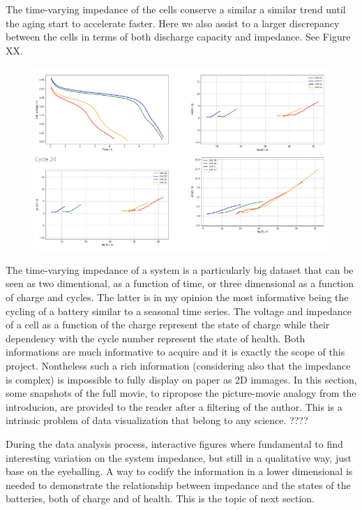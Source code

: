 The time-varying impedance of the cells conserve a similar a similar trend until the aging start to accelerate faster. Here we also assist to a larger discrepancy between the cells in terms of both discharge capacity and impedance. See Figure XX.

\begin{figure}
    \centering
    \includegraphics[width=\linewidth]{figures/application4/image6.PNG}
\end{figure}

The time-varying impedance of a system is a particularly big dataset that can be seen as two dimentional, as a function of time, or three dimensional as a function of charge and cycles. The latter is in my opinion the most informative being the cycling of a battery similar to a seasonal time series. The voltage and impedance of a cell as a function of the charge represent the state of charge while their dependency with the cycle number represent the state of health. Both informations are much informative to acquire and it is exactly the scope of this project. Nontheless such a rich information (considering also that the impedance is complex) is impossible to fully display on paper as 2D immages. In this section, some snapshots of the full movie, to ripropose the picture-movie analogy from the introducion, are provided to the reader after a filtering of the author. This is a intrinsic problem of data visualization that belong to any science. ????

During the data analysis process, interactive figures where fundamental to find interesting variation on the system impedance, but still in a qualitative way, just base on the eyeballing. A way to codify the information in a lower dimensional is needed to demonstrate the relationship between impedance and the states of the batteries, both of charge and of health. This is the topic of next section.

